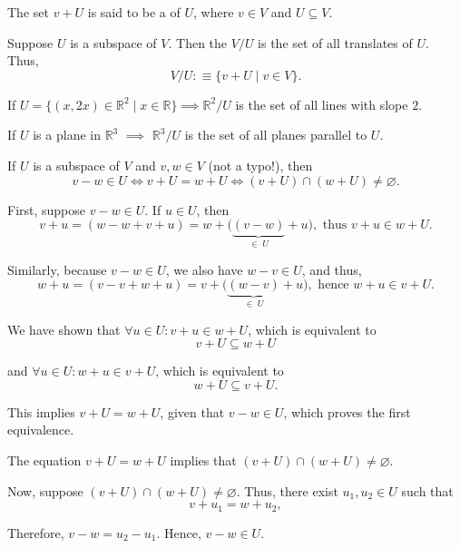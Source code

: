 \setcounter{thm}{96}
\begin{mydef} [translate]
  The set $v+U$ is said to be a  of $U$, where $v\in V$ and $U \subseteq V$.
\end{mydef}

\setcounter{thm}{98}
\begin{mydef} 
  Suppose $U$ is a subspace of $V$. Then the  $V/U$ is the set of all translates of $U$. Thus,
  \begin{equation}
    V/U :\equiv \{v+U \mid v\in V\}.
  \end{equation}
\end{mydef}

\begin{example}
  If $U=\{ (x,2x)\in \mathbb{R}^2 \mid x\in \mathbb{R} \} \implies \mathbb{R}^2/U$ is the set of all lines with slope $2$.

  If $U$ is a plane in $\mathbb{R}^3$ $\implies$ $\mathbb{R}^3/U$ is the set of all planes parallel to $U$.
\end{example}

\begin{thm} 
  \label{thm: two translates of a subspace are equal or disjoint}
  If $U$ is a subspace of $V$ and $v,w\in V$ (not a typo!), then
  \begin{equation}
    v-w \in U \iff v+U = w + U \iff (v+U)\cap (w+U) \neq \varnothing.
  \end{equation}
\end{thm}
\begin{prf}
  \StepOne First, suppose $v-w\in U$. If $u \in U$, then
  \[
    v+u = (w - w + v + u) = w + \Big( \underbrace{(v-w)}_{\in \; U} + u\Big), \text{ thus } v+u \in w+U.
  \]

  Similarly, because $v-w \in U$, we also have $w-v \in U$, and thus,
  \[
    w+u = (v - v + w + u) = v+\Big( \underbrace{(w-v)}_{\in \; U}+u \Big), \text{ hence } w+u \in v+U.
  \]

  We have shown that $\forall u \in U: v+u \in w+U$, which is equivalent to \[ v+U \subseteq w + U\]

  and $\forall u \in U: w+u \in v+U$, which is equivalent to \[ w+U \subseteq v+U.\]

  This implies $v+U = w+U$, given that $v-w \in U$, which proves the first equivalence.

  \StepTwo The equation $v+U = w+U$ implies that $(v+U) \cap (w+U) \neq \varnothing$.

  \StepThree Now, suppose $(v+U) \cap (w+U) \neq \varnothing$. Thus, there exist $u_1, u_2 \in U$ such that
  \[
    v+u_1 = w+u_2,
  \]

  Therefore, $v-w = u_2-u_1$. Hence, $v-w \in U$.
\end{prf}

